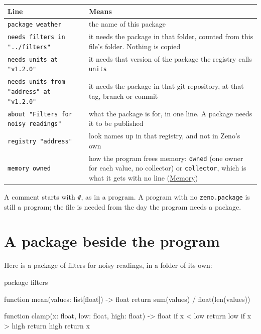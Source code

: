 \begin{center}
\begin{tabular}{lP{7.6cm}}
\toprule
Line & Means \\
\midrule
\verb|package weather| & the name of this package \\
\verb|needs filters in "../filters"| & it needs the package in that
  folder, counted from this file's folder. Nothing is copied \\
\verb|needs units at "v1.2.0"| & it needs that version of the package
  the registry calls \verb|units| \\
\verb|needs units from "address" at "v1.2.0"| & it needs the package in
  that git repository, at that tag, branch or commit \\
\verb|about "Filters for noisy readings"| & what the package is for, in
  one line. A package needs it to be published \\
\verb|registry "address"| & look names up in that registry, and not in
  Zeno's own \\
\verb|memory owned| & how the program frees memory: \verb|owned| (one
  owner for each value, no collector) or \verb|collector|, which is what
  it gets with no line (\hyperref[ch-memory]{Memory}) \\
\bottomrule
\end{tabular}
\end{center}

A comment starts with \verb|#|, as in a program. A program with no
\verb|zeno.package| is still a program; the file is needed from the
day the program needs a package.

\section{A package beside the program}

Here is a package of filters for noisy readings, in a folder of its
own:

\begin{zeno}[file=filters/zeno.package, dir=thermo, run=no]
package filters
\end{zeno}

\begin{zeno}[file=filters/filters.zeno, dir=thermo, run=no]
function mean(values: list[float]) -> float {
    return sum(values) / float(len(values))
}

function clamp(x: float, low: float, high: float) -> float {
    if x < low {
        return low
    }
    if x > high {
        return high
    }
    return x
}
\end{zeno}

